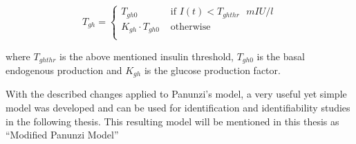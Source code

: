 \begin{equation} 
  T_{gh}=\left\{ \begin{array}{cc} 
  T_{gh0} & \mbox{ if } I(t) < T_{gh thr} \mbox{ }mIU/l\\ 
  K_{gh}\cdot T_{gh0} & \mbox{ otherwise } \\	
  \end{array} \right.
\label{eq:tegehache}
\end{equation}

where $T_{gh thr}$ is the above mentioned insulin threshold, $T_{gh0}$ is the basal endogenous production and $K_{gh}$ is the glucose production factor. 

With the described changes applied to Panunzi's model, a very useful yet simple model was developed and can be used for identification and identifiability studies in the following thesis. This resulting model will be mentioned in this thesis as ``Modified Panunzi Model'' 

